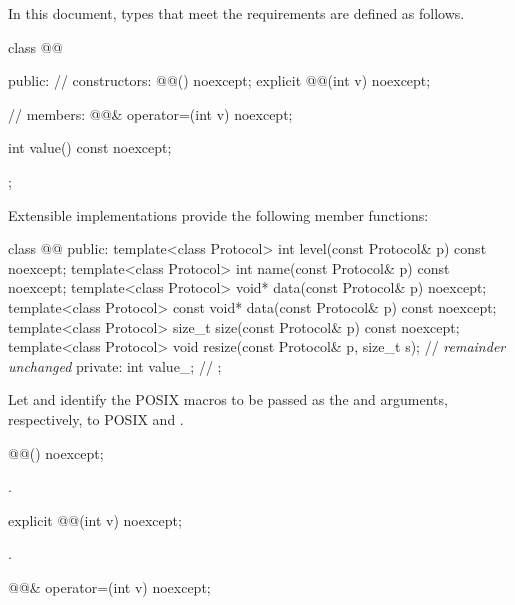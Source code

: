 \pnum
In this document, types that meet the  requirements are defined as follows.

\begin{codeblock}
class @@
{
public:
  // constructors:
  @@() noexcept;
  explicit @@(int v) noexcept;

  // members:
  @@& operator=(int v) noexcept;

  int value() const noexcept;
};
\end{codeblock}

%
\pnum
Extensible implementations provide the following member functions:

\begin{codeblock}
class @@
{
public:
  template<class Protocol> int level(const Protocol& p) const noexcept;
  template<class Protocol> int name(const Protocol& p) const noexcept;
  template<class Protocol> void* data(const Protocol& p) noexcept;
  template<class Protocol> const void* data(const Protocol& p) const noexcept;
  template<class Protocol> size_t size(const Protocol& p) const noexcept;
  template<class Protocol> void resize(const Protocol& p, size_t s);
  // \textit{remainder unchanged}
private:
  int value_; // \expos
};
\end{codeblock}

\pnum
Let  and  identify the POSIX macros to be passed as the  and  arguments, respectively, to POSIX  and .

\begin{itemdecl}
@@() noexcept;
\end{itemdecl}

\begin{itemdescr}
\pnum
\postconditions {}.
\end{itemdescr}

\begin{itemdecl}
explicit @@(int v) noexcept;
\end{itemdecl}

\begin{itemdescr}
\pnum
\postconditions {}.
\end{itemdescr}

\begin{itemdecl}
@@& operator=(int v) noexcept;
\end{itemdecl}

